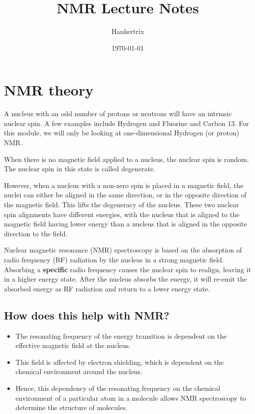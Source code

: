 \documentclass[11pt]{article}
\author{Hankertrix}
\date{\today}
\title{NMR Lecture Notes}
\begin{document}
\maketitle
\setcounter{tocdepth}{2}
\tableofcontents

\newpage

\section{NMR theory}
\label{sec:orgd934d67}
A nucleus with an odd number of protons or neutrons will have an intrinsic nuclear spin. A few examples include Hydrogen and Fluorine and Carbon 13. For this module, we will only be looking at one-dimensional Hydrogen (or proton) NMR.

When there is no magnetic field applied to a nucleus, the nuclear spin is random. The nuclear spin in this state is called degenerate.

However, when a nucleus with a non-zero spin is placed in a magnetic field, the nuclei can either be aligned in the same direction, or in the opposite direction of the magnetic field. This lifts the degeneracy of the nucleus. These two nuclear spin alignments have different energies, with the nucleus that is aligned to the magnetic field having lower energy than a nucleus that is aligned in the opposite direction to the field.

Nuclear magnetic resonance (NMR) spectroscopy is based on the absorption of radio frequency (RF) radiation by the nucleus in a strong magnetic field. Absorbing a \textbf{specific} radio frequency causes the nuclear spin to realign, leaving it in a higher energy state. After the nucleus absorbs the energy, it will re-emit the absorbed energy as RF radiation and return to a lower energy state.

\subsection{How does this help with NMR?}
\label{sec:orga30e70b}
\begin{itemize}
\item The resonating frequency of the energy transition is dependent on the effective magnetic field at the nucleus.
\item This field is affected by electron shielding, which is dependent on the chemical environment around the nucleus.
\item Hence, this dependency of the resonating frequency on the chemical environment of a particular atom in a molecule allows NMR spectroscopy to determine the structure of molecules.
\end{itemize}
\end{document}
